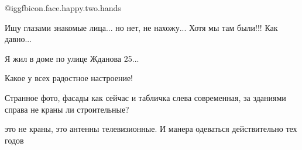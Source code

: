  
 
 
 
 



 @igg{fbicon.face.happy.two.hands} 

Ищу глазами знакомые лица... но нет, не нахожу...
Хотя мы там были!!! Как давно...

Я жил в доме по улице Жданова 25...

Какое у всех радостное настроение!

Странное фото, фасады как сейчас и табличка слева современная, за зданиями справа не краны ли строительные?


это не краны, это антенны телевизионные. И манера одеваться действительно тех
годов
